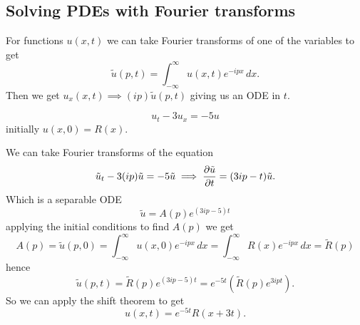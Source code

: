 \documentclass[10pt, a4paper]{article}
\begin{document}
\subsection{Solving PDEs with Fourier transforms}
For functions $u(x, t)$ we can take Fourier transforms of one of the variables to get
\[
\tilde{u}(p, t) = \int_{-\infty}^{\infty}u(x, t)e ^ {-ipx}\,dx.
\]
Then we get $u_{x}(x, t) \implies (ip)\tilde{u}(p, t)$ giving us an ODE in $t$.

\begin{example}
    \[
    u_t - 3u_x = -5u
    \]
    initially $u(x, 0) = R(x)$.

    We can take Fourier transforms of the equation
    \[
    \tilde{u}_t - 3(ip)\tilde{u} = -5\tilde{u} \implies \pd[\tilde{u}]{t} = (3ip - t)\tilde{u}.
    \]
    Which is a separable ODE
    \[
    \tilde{u} = A(p)e ^ {(3ip - 5)t}
    \]
    applying the initial conditions to find $A(p)$ we get
    \[
    A(p) = \tilde{u}(p, 0) = \int_{-\infty}^{\infty}u(x, 0)e ^ {-ipx}\,dx = \int_{-\infty}^{\infty}R(x)e ^ {-ipx}\,dx = \tilde{R}(p)
    \]
    hence
    \[
    \tilde{u}(p, t) = \tilde{R}(p)e ^ {(3ip - 5)t} = e ^ {-5t}(\tilde{R}(p)e ^ {3ipt}).
    \]
    So we can apply the shift theorem to get
    \[
    u(x, t) = e ^ {-5t}R(x + 3t).
    \]
\end{example}
\end{document}
